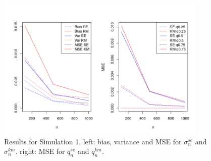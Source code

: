 \begin{figure}[h!]
	\begin{center}
		\includegraphics[width=0.9\textwidth]{./figures/expexp_mse2}
	\end{center}
	\caption{Results for Simulation 1. left: bias, variance and MSE for $\sigma_n^{se}$ and $\sigma_n^{km}$. right: MSE for $q_n^{se}$ and $q_n^{km}$.}
	\label{fig:mse_expexp}
\end{figure}
\clearpage
%
%
%
